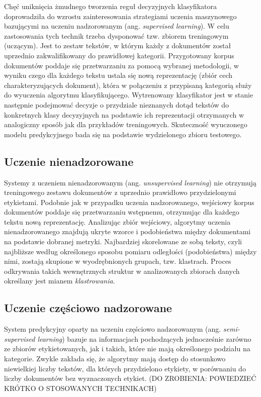 \documentclass{pracamgr}
\begin{document}
Chęć uniknięcia żmudnego tworzenia reguł decyzyjnych klasyfikatora doprowadziła do wzrostu zainteresowania strategiami uczenia maszynowego bazującymi na uczeniu nadzorowanym (ang. \textit{supervised learning}). W celu zastosowania tych technik trzeba dysponować tzw. zbiorem treningowym (uczącym). Jest to zestaw tekstów, w którym każdy z dokumentów został uprzednio zakwalifikowany do prawidłowej kategorii. Przygotowany korpus dokumentów poddaje się przetwarzaniu za pomocą wybranej metodologii, w wyniku czego dla każdego tekstu ustala się nową reprezentację (zbiór cech charakteryzujących dokument), która w połączeniu z przypisaną kategorią służy do wyuczenia algorytmu klasyfikującego. Wytrenowany klasyfikator jest w stanie następnie podejmować decyzje o przydziale nieznanych dotąd tekstów do konkretnych klasy decyzyjnych na podstawie ich reprezentacji otrzymanych w analogiczny sposób jak dla przykładów treningowych.
Skuteczność wyuczonego modelu predykcyjnego bada się na podstawie wydzielonego zbioru testowego.

\subsection{Uczenie nienadzorowane}

Systemy z uczeniem nienadzorowanym (ang. \textit{unsupervised learning}) nie otrzymują treningowego zestawu dokumentów z uprzednio prawidłowo przydzielonymi etykietami. Podobnie jak w przypadku uczenia nadzorowanego, wejściowy korpus dokumentów poddaje się przetwarzaniu wstępnemu, otrzymując dla każdego tekstu nową reprezentację. Analizując zbiór wejściowy, algorytmy uczenia nienadzorowanego znajdują ukryte wzorce i podobieństwa między dokumentami na podstawie dobranej metryki. Najbardziej skorelowane ze sobą teksty, czyli najbliższe według określonego sposobu pomiaru odległości (podobieństwa) między nimi, zostają skupione w wyodrębnionych grupach, tzw. klastrach. Proces odkrywania takich wewnętrznych struktur w analizowanych zbiorach danych określany jest mianem \textit{klastrowania}. 

\subsection{Uczenie częściowo nadzorowane}

System predykcyjny oparty na uczeniu częściowo nadzorowanym (ang. \textit{semi-supervised learning}) bazuje na informacjach pochodzących jednocześnie zarówno ze zbiorów etykietowanych, jak i takich, które nie mają określonego podziału na kategorie. Zwykle zakłada się, że algorytmy mają dostęp do stosunkowo niewielkiej liczby tekstów, dla których przydzielono etykiety, w porównaniu do liczby dokumentów bez wyznaczonych etykiet.
(DO ZROBIENIA: POWIEDZIEĆ KRÓTKO O STOSOWANYCH TECHNIKACH)
\end{document}
